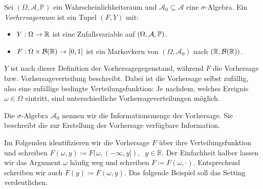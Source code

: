 \begin{defi}[Vorhersageraum] \label{def::room}
Sei $(\Omega, \mathcal{A}, \mathbb{P})$ ein Wahrscheinlichkeitsraum und $\mathcal{A}_0 \subseteq \mathcal{A}$ eine $\sigma$-Algebra.
Ein \emph{Vorhersageraum} ist ein Tupel $(F, Y)$ mit:
\begin{itemize}
    \item $Y: \Omega \to \mathbb{R}$ ist eine Zufallsvariable auf $(\Omega, \mathcal{A}, \mathbb{P})$.
    \item $F: \Omega \times \mathcal{B}(\mathbb{R}) \to [0,1]$ ist ein Markovkern von $(\Omega, \mathcal{A}_0)$ nach $(\mathbb{R}, \mathcal{B}(\mathbb{R}))$.
\end{itemize}{}
\end{defi}

\noindent
$Y$ ist nach dieser Definition der Vorhersagegegenstand, während $F$ die Vorhersage bzw. Vorhersageverteilung beschreibt. Dabei ist die Vorhersage selbst zufällig, also eine zufällige bedingte Verteilungsfunktion: Je nachdem, welches Ereignis $\omega \in \Omega$ eintritt, sind unterschiedliche Vorhersageverteilungen möglich.

Die $\sigma$-Algebra $\mathcal{A}_0$ nennen wir die Informationsmenge der Vorhersage. Sie beschreibt die zur Erstellung der Vorhersage verfügbare Information. 

Im Folgenden identifizieren wir die Vorhersage $F$ über ihre Verteilungsfunktion und schreiben
$F(\omega,y) \coloneqq F(\omega,(-\infty,y]), \;\;y \in \mathbb{R}$. Der Einfachheit halber lassen wir das Argument $\omega$ häufig weg und schreiben  $F \coloneqq F(\omega,\cdot)$. Entsprechend schreiben wir auch $F(y)\coloneqq F(\omega,y)$. Das folgende Beispiel soll das Setting verdeutlichen.

